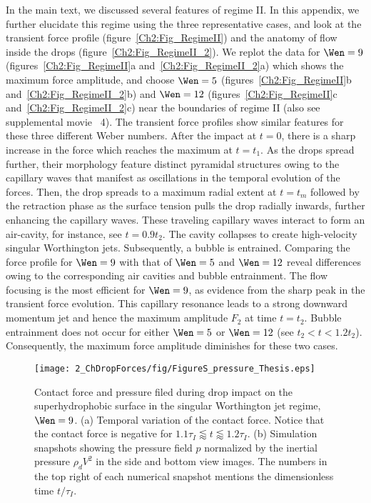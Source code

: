 \begin{subappendices}
	In the main text, we discussed several features of regime II. In this appendix, we further elucidate this regime using the three representative cases, and look at the transient force profile (figure~\ref{Ch2:Fig_RegimeII}) and the anatomy of flow inside the drops (figure~\ref{Ch2:Fig_RegimeII_2}). We replot the data for $\Wen = 9$ (figures~\ref{Ch2:Fig_RegimeII}a and~\ref{Ch2:Fig_RegimeII_2}a) which shows the maximum force amplitude, and choose $\Wen = 5$ (figures~\ref{Ch2:Fig_RegimeII}b and~\ref{Ch2:Fig_RegimeII_2}b) and $\Wen = 12$ (figures~\ref{Ch2:Fig_RegimeII}c and~\ref{Ch2:Fig_RegimeII_2}c) near the boundaries of regime II (also see supplemental movie~{\color{Myfig} 4}). The transient force profiles show similar features for these three different Weber numbers. After the impact at $t = 0$, there is a sharp increase in the force which reaches the maximum at $t = t_1$. As the drops spread further, their morphology feature distinct pyramidal structures owing to the capillary waves \cite{renardy2003pyramidal} that manifest as oscillations in the temporal evolution of the forces. Then, the drop spreads to a maximum radial extent at $t = t_m$ followed by the retraction phase as the surface tension pulls the drop radially inwards, further enhancing the capillary waves. These traveling capillary waves interact to form an air-cavity, for instance, see $t = 0.9t_2$. The cavity collapses to create high-velocity singular Worthington jets. Subsequently, a bubble is entrained. Comparing the force profile for $\Wen = 9$ with that of $\Wen = 5$ and $\Wen = 12$ reveal differences owing to the corresponding air cavities and bubble entrainment. The flow focusing is the most efficient for $\Wen = 9$, as evidence from the sharp peak in the transient force evolution. This capillary resonance leads to a strong downward momentum jet and hence the maximum amplitude $F_2$ at time $t = t_2$. Bubble entrainment does not occur for either $\Wen = 5$ or $\Wen = 12$ (see $t_2 < t < 1.2t_2$). Consequently, the maximum force amplitude diminishes for these two cases. 
	
	\begin{figure}
		\centering
		\texttt{[image: 2\_ChDropForces/fig/FigureS\_pressure\_Thesis.eps]}
		\caption{Contact force and pressure filed during drop impact on the superhydrophobic surface in the singular Worthington jet regime, $\Wen = 9$. (a) Temporal variation of the contact force. Notice that the contact force is negative for $1.1\tau_I \lessapprox t \lessapprox 1.2\tau_I$. (b) Simulation snapshots showing the pressure field $p$ normalized by the inertial pressure $\rho_dV^2$ in the side and bottom view images. The numbers in the top right of each numerical snapshot mentions the dimensionless time $t/\tau_I$.}
		\label{Fig_Pressure}
	\end{figure}
	

\end{subappendices}
